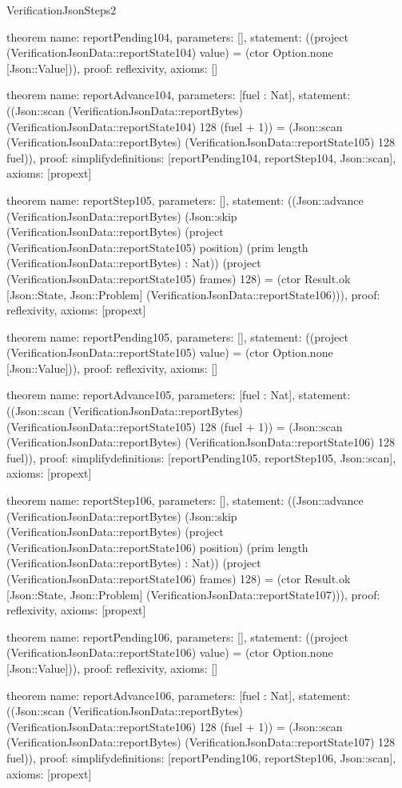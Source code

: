 \begin{lexlean}{VerificationJsonSteps2}
\begin{semanticmodule}
theorem{
  name: reportPending104,
  parameters: [],
  statement: ((project (VerificationJsonData::reportState104) value) = (ctor Option.none [Json::Value])),
  proof: reflexivity{},
  axioms: []
}

theorem{
  name: reportAdvance104,
  parameters: [fuel : Nat],
  statement: ((Json::scan (VerificationJsonData::reportBytes) (VerificationJsonData::reportState104) 128 (fuel + 1)) = (Json::scan (VerificationJsonData::reportBytes) (VerificationJsonData::reportState105) 128 fuel)),
  proof: simplify{definitions: [reportPending104, reportStep104, Json::scan]},
  axioms: [propext]
}

theorem{
  name: reportStep105,
  parameters: [],
  statement: ((Json::advance (VerificationJsonData::reportBytes) (Json::skip (VerificationJsonData::reportBytes) (project (VerificationJsonData::reportState105) position) (prim length (VerificationJsonData::reportBytes) : Nat)) (project (VerificationJsonData::reportState105) frames) 128) = (ctor Result.ok [Json::State, Json::Problem] (VerificationJsonData::reportState106))),
  proof: reflexivity{},
  axioms: [propext]
}

theorem{
  name: reportPending105,
  parameters: [],
  statement: ((project (VerificationJsonData::reportState105) value) = (ctor Option.none [Json::Value])),
  proof: reflexivity{},
  axioms: []
}

theorem{
  name: reportAdvance105,
  parameters: [fuel : Nat],
  statement: ((Json::scan (VerificationJsonData::reportBytes) (VerificationJsonData::reportState105) 128 (fuel + 1)) = (Json::scan (VerificationJsonData::reportBytes) (VerificationJsonData::reportState106) 128 fuel)),
  proof: simplify{definitions: [reportPending105, reportStep105, Json::scan]},
  axioms: [propext]
}

theorem{
  name: reportStep106,
  parameters: [],
  statement: ((Json::advance (VerificationJsonData::reportBytes) (Json::skip (VerificationJsonData::reportBytes) (project (VerificationJsonData::reportState106) position) (prim length (VerificationJsonData::reportBytes) : Nat)) (project (VerificationJsonData::reportState106) frames) 128) = (ctor Result.ok [Json::State, Json::Problem] (VerificationJsonData::reportState107))),
  proof: reflexivity{},
  axioms: [propext]
}

theorem{
  name: reportPending106,
  parameters: [],
  statement: ((project (VerificationJsonData::reportState106) value) = (ctor Option.none [Json::Value])),
  proof: reflexivity{},
  axioms: []
}

theorem{
  name: reportAdvance106,
  parameters: [fuel : Nat],
  statement: ((Json::scan (VerificationJsonData::reportBytes) (VerificationJsonData::reportState106) 128 (fuel + 1)) = (Json::scan (VerificationJsonData::reportBytes) (VerificationJsonData::reportState107) 128 fuel)),
  proof: simplify{definitions: [reportPending106, reportStep106, Json::scan]},
  axioms: [propext]
}


\end{semanticmodule}
\end{lexlean}
